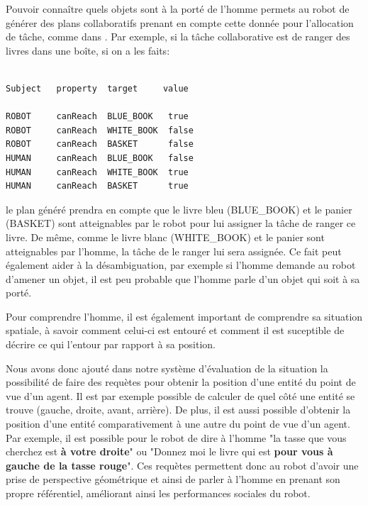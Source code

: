 \documentclass[a4paper,11pt,twoside]{StyleThese}
\begin{document}
Pouvoir connaître quels objets sont à la porté de l'homme permets au robot de générer des plans collaboratifs prenant en compte cette donnée pour l'allocation de tâche, comme dans \cite{gharbi2015}.
Par exemple, si la tâche collaborative est de ranger des livres dans une boîte, si on a les faits:

\begin{scriptsize}
\begin{verbatim}

Subject   property  target     value

ROBOT     canReach  BLUE_BOOK   true
ROBOT     canReach  WHITE_BOOK  false
ROBOT     canReach  BASKET      false
HUMAN     canReach  BLUE_BOOK   false
HUMAN     canReach  WHITE_BOOK  true
HUMAN     canReach  BASKET      true
\end{verbatim}
\end{scriptsize}

le plan généré prendra en compte que le livre bleu (BLUE\_BOOK) et le panier (BASKET) sont atteignables par le robot pour lui assigner la tâche de ranger ce livre. De même, comme le livre blanc (WHITE\_BOOK) et le panier sont atteignables par l'homme, la tâche de le ranger lui sera assignée.
Ce fait peut également aider à la désambiguation, par exemple si l'homme demande au robot d'amener un objet, il est peu probable que l'homme parle d'un objet qui soit à sa porté.

Pour comprendre l'homme, il est également important de comprendre sa situation spatiale, à savoir comment celui-ci est entouré et comment il est suceptible de décrire ce qui l'entour par rapport à sa position.

Nous avons donc ajouté dans notre système d'évaluation de la situation la possibilité de faire des requètes pour obtenir la position d'une entité du point de vue d'un agent. Il est par exemple possible de calculer de quel côté une entité se trouve (gauche, droite, avant, arrière).
De plus, il est aussi possible d'obtenir la position d'une entité comparativement à une autre du point de vue d'un agent. Par exemple, il est possible pour le robot de dire à l'homme "la tasse que vous cherchez est \textbf{à votre droite}" ou "Donnez moi le livre qui est \textbf{pour vous à gauche de la tasse rouge}".
Ces requètes permettent donc au robot d'avoir une prise de perspective géométrique et ainsi de parler à l'homme en prenant son propre référentiel, améliorant ainsi les performances sociales du robot.
\end{document}
